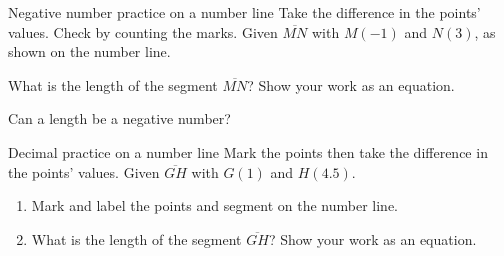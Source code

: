 \begin{frame}{Negative number practice on a number line}
  {Take the difference in the points' values. Check by counting the marks.}
  Given $\overline{MN}$ with $M(-1)$ and $N(3)$, as shown on the number line.
\begin{center}
  \end{center} \bigskip
What is the length of the segment $\overline{MN}$? Show your work as an equation. \par \bigskip
Can a length be a negative number? \vspace{2cm}  
\end{frame}

\begin{frame}{Decimal practice on a number line}
  {Mark the points then take the difference in the points' values.}
  Given $\overline{GH}$ with $G(1)$ and $H(4.5)$. \\[1.5cm]
  \begin{center}
  \end{center}
    \begin{enumerate}
      \item Mark and label the points and segment on the number line.
      \item What is the length of the segment $\overline{GH}$? Show your work as an equation.
    \end{enumerate} \vspace{2cm}  
\end{frame}


